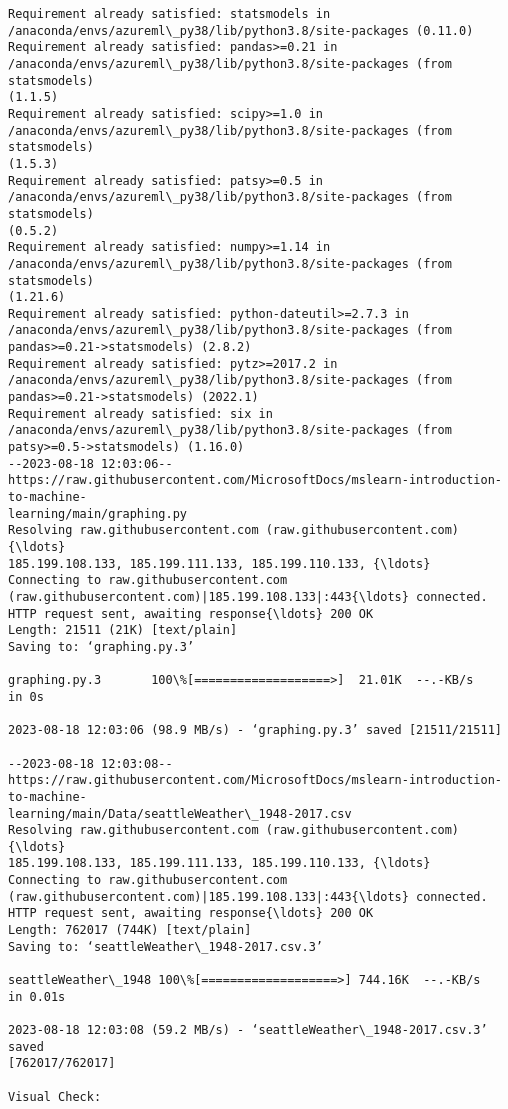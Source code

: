 \documentclass[11pt]{article}
\begin{document}
    \begin{Verbatim}[commandchars=\\\{\}]
Requirement already satisfied: statsmodels in
/anaconda/envs/azureml\_py38/lib/python3.8/site-packages (0.11.0)
Requirement already satisfied: pandas>=0.21 in
/anaconda/envs/azureml\_py38/lib/python3.8/site-packages (from statsmodels)
(1.1.5)
Requirement already satisfied: scipy>=1.0 in
/anaconda/envs/azureml\_py38/lib/python3.8/site-packages (from statsmodels)
(1.5.3)
Requirement already satisfied: patsy>=0.5 in
/anaconda/envs/azureml\_py38/lib/python3.8/site-packages (from statsmodels)
(0.5.2)
Requirement already satisfied: numpy>=1.14 in
/anaconda/envs/azureml\_py38/lib/python3.8/site-packages (from statsmodels)
(1.21.6)
Requirement already satisfied: python-dateutil>=2.7.3 in
/anaconda/envs/azureml\_py38/lib/python3.8/site-packages (from
pandas>=0.21->statsmodels) (2.8.2)
Requirement already satisfied: pytz>=2017.2 in
/anaconda/envs/azureml\_py38/lib/python3.8/site-packages (from
pandas>=0.21->statsmodels) (2022.1)
Requirement already satisfied: six in
/anaconda/envs/azureml\_py38/lib/python3.8/site-packages (from
patsy>=0.5->statsmodels) (1.16.0)
--2023-08-18 12:03:06--
https://raw.githubusercontent.com/MicrosoftDocs/mslearn-introduction-to-machine-
learning/main/graphing.py
Resolving raw.githubusercontent.com (raw.githubusercontent.com){\ldots}
185.199.108.133, 185.199.111.133, 185.199.110.133, {\ldots}
Connecting to raw.githubusercontent.com
(raw.githubusercontent.com)|185.199.108.133|:443{\ldots} connected.
HTTP request sent, awaiting response{\ldots} 200 OK
Length: 21511 (21K) [text/plain]
Saving to: ‘graphing.py.3’

graphing.py.3       100\%[===================>]  21.01K  --.-KB/s    in 0s

2023-08-18 12:03:06 (98.9 MB/s) - ‘graphing.py.3’ saved [21511/21511]

--2023-08-18 12:03:08--
https://raw.githubusercontent.com/MicrosoftDocs/mslearn-introduction-to-machine-
learning/main/Data/seattleWeather\_1948-2017.csv
Resolving raw.githubusercontent.com (raw.githubusercontent.com){\ldots}
185.199.108.133, 185.199.111.133, 185.199.110.133, {\ldots}
Connecting to raw.githubusercontent.com
(raw.githubusercontent.com)|185.199.108.133|:443{\ldots} connected.
HTTP request sent, awaiting response{\ldots} 200 OK
Length: 762017 (744K) [text/plain]
Saving to: ‘seattleWeather\_1948-2017.csv.3’

seattleWeather\_1948 100\%[===================>] 744.16K  --.-KB/s    in 0.01s

2023-08-18 12:03:08 (59.2 MB/s) - ‘seattleWeather\_1948-2017.csv.3’ saved
[762017/762017]

Visual Check:
    \end{Verbatim}
\end{document}
